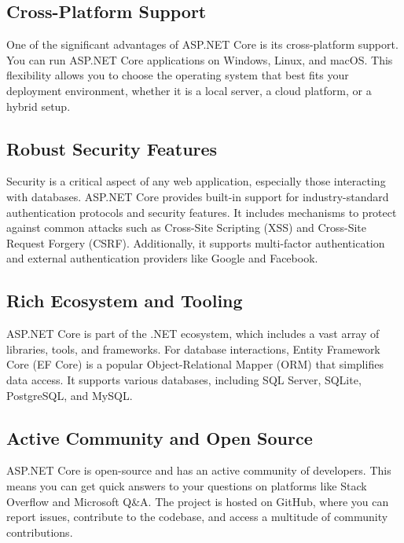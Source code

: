 \subsection{Cross-Platform Support}
One of the significant advantages of ASP.NET Core is its cross-platform support.
You can run ASP.NET Core applications on Windows, Linux, and macOS. This
flexibility allows you to choose the operating system that best fits your
deployment environment, whether it is a local server, a cloud platform, or a
hybrid setup.

\subsection{Robust Security Features}
Security is a critical aspect of any web application, especially those
interacting with databases. ASP.NET Core provides built-in support for
industry-standard authentication protocols and security features. It includes
mechanisms to protect against common attacks such as Cross-Site Scripting (XSS)
and Cross-Site Request Forgery (CSRF). Additionally, it supports multi-factor
authentication and external authentication providers like Google and Facebook.

\subsection{Rich Ecosystem and Tooling}
ASP.NET Core is part of the .NET ecosystem, which includes a vast array of
libraries, tools, and frameworks. For database interactions, Entity Framework
Core (EF Core) is a popular Object-Relational Mapper (ORM) that simplifies data
access. It supports various databases, including SQL Server, SQLite, PostgreSQL,
and MySQL.

\subsection{Active Community and Open Source}
ASP.NET Core is open-source and has an active community of developers. This
means you can get quick answers to your questions on platforms like Stack
Overflow and Microsoft Q\&A. The project is hosted on GitHub, where you can
report issues, contribute to the codebase, and access a multitude of community
contributions.


